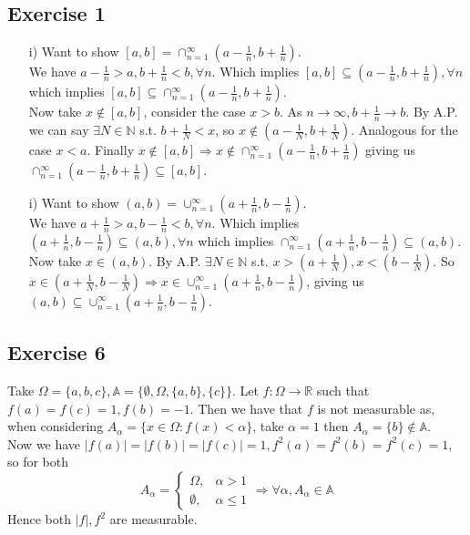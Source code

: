 \documentclass[a4paper, 12pt, twoside]{article}
\author{jdRanda}
\begin{document}
\subsection*{Exercise 1}
\begin{itemize}
    \item[i)] Want to show $[a,b]=\cap_{n=1}^{\infty}(a- \frac{1}{n},b+ \frac{1}{n}) $.\\
    We have $a- \frac{1}{n}> a,b+ \frac{1}{n}< b, \forall n$. Which implies $[a,b]\subseteq(a- \frac{1}{n},b+ \frac{1}{n}), \forall n$ which implies $[a,b]\subseteq\cap_{n=1}^{\infty}(a- \frac{1}{n},b+ \frac{1}{n})$.\\
    Now take $x\not\in[a,b]$, consider the case $x>b$. As $n\to\infty, b+\frac{1}{n}\to b$. By A.P. we can say $\exists N\in \mathbb{N}$ s.t. $b+\frac{1}{N}<x$, so $x\not\in (a- \frac{1}{N},b+ \frac{1}{N})$.
    Analogous for the case $x<a$. Finally $x\not\in[a,b]\Rightarrow x\not\in\cap_{n=1}^{\infty}(a- \frac{1}{n},b+ \frac{1}{n}) $ giving us $\cap_{n=1}^{\infty}(a- \frac{1}{n},b+ \frac{1}{n}) \subseteq [a,b]$.
    \item[i)]Want to show $(a,b)=\cup_{n=1}^{\infty}(a+ \frac{1}{n},b- \frac{1}{n}) $.\\
    We have $a+ \frac{1}{n}> a,b- \frac{1}{n}< b, \forall n$. Which implies $(a+ \frac{1}{n},b- \frac{1}{n})\subseteq(a,b), \forall n$ which implies $\cap_{n=1}^{\infty}(a+ \frac{1}{n},b- \frac{1}{n})\subseteq(a,b)$.\\
    Now take $x\in(a,b)$. By A.P. $\exists N\in \mathbb{N} $ s.t. $x>(a+\frac{1}{N}),x<(b- \frac{1}{N})$. So $x\in(a+\frac{1}{N},b- \frac{1}{N}) \Rightarrow x\in \cup_{n=1}^{\infty}(a+ \frac{1}{n},b- \frac{1}{n}) $, giving us $(a,b)\subseteq\cup_{n=1}^{\infty}(a+ \frac{1}{n},b- \frac{1}{n})$.

\end{itemize}
\subsection*{Exercise 6}
Take $\Omega=\{a,b,c\},\mathbb{A}=\{\emptyset,\Omega,\{a,b\},\{c\}\}$. Let $f:\Omega\to \mathbb{R}$ such that $f(a)=f(c)=1,f(b)=-1$. Then we have that $f$ is not measurable as, when considering $A_{\alpha}=\{x\in\Omega: f(x)<\alpha\}$, take $\alpha = 1$ then $A_{\alpha}=\{b\}\not\in \mathbb{A}$.\\
Now we have $|f(a)|=|f(b)|=|f(c)|=1,f^{2}(a)=f^{2}(b)=f^{2}(c)=1$, so for both
$$A_{\alpha}=
\begin{cases}
  \Omega, & \alpha > 1 \\
  \emptyset, & \alpha \leq 1
\end{cases} \Rightarrow \forall\alpha, A_{\alpha}\in \mathbb{A}
$$
Hence both $|f|,f^{2}$ are measurable.
\end{document}
